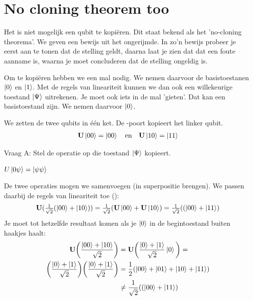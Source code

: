 \documentclass[../main.tex]{subfiles}
\begin{document}
\clearpage

\section*{No cloning theorem too}
Het is niet mogelijk een qubit te kopi\"eren. Dit staat bekend als het 'no-cloning theorema'. We geven een bewijs uit het ongerijmde. In zo'n bewijs probeer je eerst aan te tonen dat de stelling geldt, daarna laat je zien dat dat een foute aanname is, waarna je moet concluderen dat de stelling ongeldig is.

Om te kopi\"eren hebben we een mal nodig. We nemen daarvoor de basistoestanen $\ket{0}$ en $\ket{1}$. Met de regels van lineariteit kunnen we dan ook een willekeurige toestand  $\ket{\Psi}$ uitrekenen. Je moet ook iets in de mal 'gieten'. Dat kan een basistoestand zijn. We nemen daarvoor $\ket{0}$.


We zetten de twee qubits in \'e\'en ket. De -poort kopieert het linker qubit.
\[\begin{aligned} \port{U}\ket{00} = \ket{00} \quad \mathrm{en} \quad \port{U}\ket{10}=\ket{11}
\end{aligned}\]

Vraag A: Stel de operatie op die toestand $\ket{\Psi}$ kopieert.\\
\begin{antwoord}
$U\ket{0\psi} = \ket{\psi\psi}$
\end{antwoord}

De twee operaties mogen we samenvoegen (in superpositie brengen). We passen daarbij de regels van lineariteit toe ():
\[\begin{aligned}\port{U}(\tfrac{1}{\sqrt{2}}(\ket{00}+\ket{10}))=\tfrac{1}{\sqrt{2}}(\port{U}\ket{00}+\port{U}\ket{10})=
\tfrac{1}{\sqrt{2}}((\ket{00}+\ket{11})\end{aligned}\]
Je moet tot hetzelfde resultaat komen als je $\ket{0}$ in de begintoestand  buiten haakjes haalt:
\[\begin{aligned}
\port{U}\bigg(\frac{\ket{00}+\ket{10}}{\sqrt{2}}\bigg)&=
\port{U}\bigg(\frac{\ket{0}+\ket{1}}{\sqrt{2}}\ket{0}\bigg) = \\
\bigg(\frac{\ket{0}+\ket{1}}{\sqrt{2}}\bigg)\bigg(\frac{\ket{0}+\ket{1}}{\sqrt{2}}\bigg)&=\frac{1}{2}(\ket{00}+\ket{01}+\ket{10}+\ket{11})\\
&\neq \frac{1}{\sqrt{2}}((\ket{00}+\ket{11})
\end{aligned}\]
\end{document}
